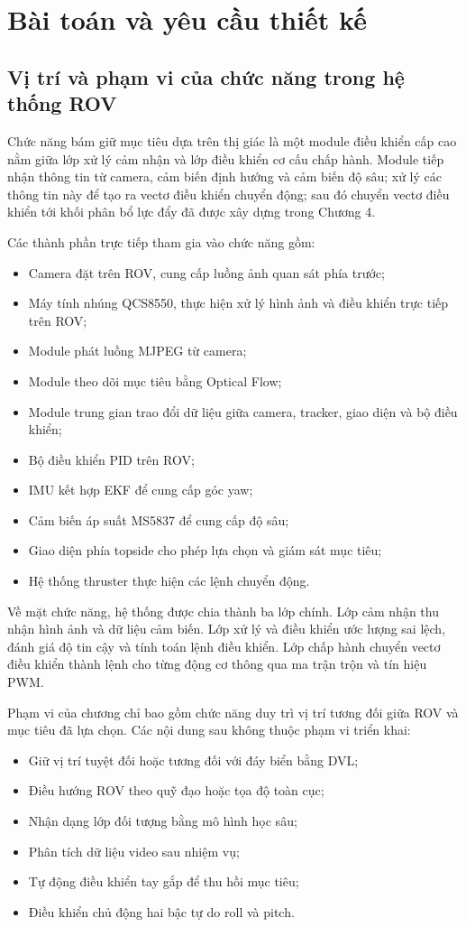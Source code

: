 \documentclass[../DoAn.tex]{subfiles}
\begin{document}
\section{Bài toán và yêu cầu thiết kế}

\subsection{Vị trí và phạm vi của chức năng trong hệ thống ROV}

Chức năng bám giữ mục tiêu dựa trên thị giác là một module điều khiển cấp cao nằm giữa lớp xử lý cảm nhận và lớp điều khiển cơ cấu chấp hành. Module tiếp nhận thông tin từ camera, cảm biến định hướng và cảm biến độ sâu; xử lý các thông tin này để tạo ra vectơ điều khiển chuyển động; sau đó chuyển vectơ điều khiển tới khối phân bổ lực đẩy đã được xây dựng trong Chương 4.

Các thành phần trực tiếp tham gia vào chức năng gồm:
\begin{itemize}
    \item Camera đặt trên ROV, cung cấp luồng ảnh quan sát phía trước;
    \item Máy tính nhúng QCS8550, thực hiện xử lý hình ảnh và điều khiển trực tiếp trên ROV;
    \item Module phát luồng MJPEG từ camera;
    \item Module theo dõi mục tiêu bằng Optical Flow;
    \item Module trung gian trao đổi dữ liệu giữa camera, tracker, giao diện và bộ điều khiển;
    \item Bộ điều khiển PID trên ROV;
    \item IMU kết hợp EKF để cung cấp góc yaw;
    \item Cảm biến áp suất MS5837 để cung cấp độ sâu;
    \item Giao diện phía topside cho phép lựa chọn và giám sát mục tiêu;
    \item Hệ thống thruster thực hiện các lệnh chuyển động.
\end{itemize}

Về mặt chức năng, hệ thống được chia thành ba lớp chính. Lớp cảm nhận thu nhận hình ảnh và dữ liệu cảm biến. Lớp xử lý và điều khiển ước lượng sai lệch, đánh giá độ tin cậy và tính toán lệnh điều khiển. Lớp chấp hành chuyển vectơ điều khiển thành lệnh cho từng động cơ thông qua ma trận trộn và tín hiệu PWM.

Phạm vi của chương chỉ bao gồm chức năng duy trì vị trí tương đối giữa ROV và mục tiêu đã lựa chọn. Các nội dung sau không thuộc phạm vi triển khai:
\begin{itemize}
    \item Giữ vị trí tuyệt đối hoặc tương đối với đáy biển bằng DVL;
    \item Điều hướng ROV theo quỹ đạo hoặc tọa độ toàn cục;
    \item Nhận dạng lớp đối tượng bằng mô hình học sâu;
    \item Phân tích dữ liệu video sau nhiệm vụ;
    \item Tự động điều khiển tay gắp để thu hồi mục tiêu;
    \item Điều khiển chủ động hai bậc tự do roll và pitch.
\end{itemize}
\end{document}
